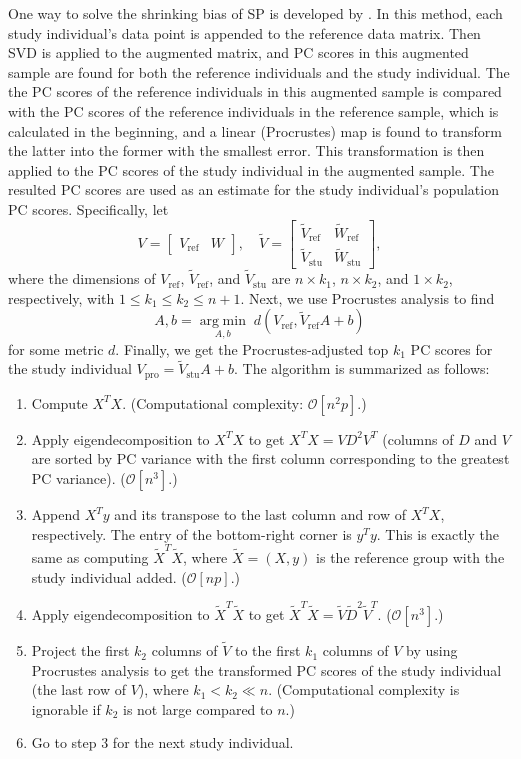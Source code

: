 \documentclass{article}
\newcommand{\bO}{\mathcal{O}}
\newcommand{\argmin}[1]{\underset{#1}{\operatorname{arg\;min}}\;}
\begin{document}
One way to solve the shrinking bias of SP is developed by \cite{wang}.
In this method, each study individual's data point is appended to the reference
data matrix.
Then SVD is applied to the augmented matrix,
and PC scores in this augmented sample are found for both the reference
individuals and the study individual.
The the PC scores of the reference individuals in this augmented sample is
compared with the PC scores of the reference individuals in the reference
sample,
which is calculated in the beginning,
and a linear (Procrustes) map is found to transform the latter into the former
with the smallest error.
This transformation is then applied to the PC scores of the study individual in
the augmented sample.
The resulted PC scores are used as an estimate for the study individual's
population PC scores.
Specifically, let
\[
  V =
  \begin{bmatrix}
    V_{\text{ref}} & W
  \end{bmatrix},
  \quad
  \tilde{V} =
  \begin{bmatrix}
    \tilde{V}_{\text{ref}} & \tilde{W}_\text{ref} \\
    \tilde{V}_\text{stu} & \tilde{W}_\text{stu}
  \end{bmatrix},
\]
where the dimensions of $V_\text{ref}$, $\tilde{V}_\text{ref}$, and $\tilde{V}_\text{stu}$ are $n \times k_1$, $n \times k_2$, and $1 \times k_2$, respectively, with $ 1 \leq k_1 \leq k_2 \leq n+1$. 
Next, we use Procrustes analysis to find
\[
  A, b = \argmin{A, b} d(V_\text{ref}, \tilde{V}_{\text{ref}}A+b)
\]
for some metric $d$.
Finally, we get the Procrustes-adjusted top $k_1$ PC scores for the study individual $V_\text{pro} = \tilde{V}_\text{stu} A + b$.
The algorithm is summarized as follows:
\begin{enumerate}
\item Compute $X^T X$.
  (Computational complexity: $\bO[n^2p]$.)  
\item Apply eigendecomposition to $X^T X$ to get $X^T X = V D^2 V^T$ (columns of $D$ and $V$ are sorted by PC variance with the first column corresponding to the greatest PC variance).
  ($\bO[n^3]$.)
\item Append $X^T y$ and its transpose to the last column and row of $X^T X$, respectively.
  The entry of the bottom-right corner is $y^T y$.
  This is exactly the same as computing $\tilde{X}^T \tilde{X}$,
  where $\tilde{X} = (X, y)$ is the reference group with the study individual added.
  ($\bO[np]$.)
\item Apply eigendecomposition to $\tilde{X}^T \tilde{X}$ to get $\tilde{X}^T \tilde{X} = \tilde{V} \tilde{D}^2 \tilde{V}^T$.
  ($\bO[n^3]$.)
\item Project the first $k_2$ columns of $\tilde{V}$ to the first $k_1$ columns of $V$ by using Procrustes analysis to get the transformed PC scores of the study individual (the last row of $V$),
  where $k_1 < k_2 \ll n$.
  (Computational complexity is ignorable if $k_2$ is not large compared to $n$.)
  \item Go to step 3 for the next study individual.
\end{enumerate}
\end{document}
